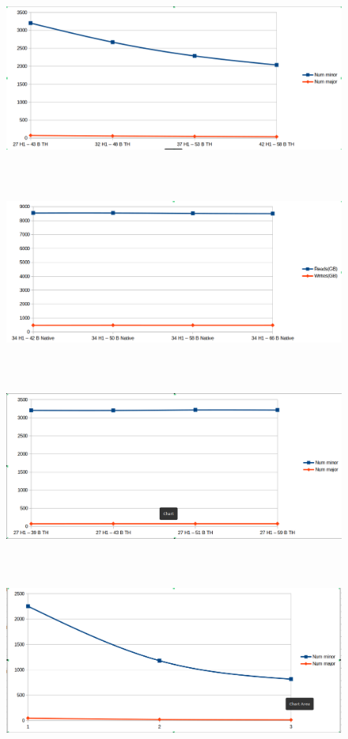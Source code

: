 \documentclass[twocolumn,10pt]{asme2e}
\begin{document}
\begin{figure}[h!]
        \includegraphics[width=12cm,height=6cm]{gcs_linr_h1_th.png}
\end{figure}

\begin{figure}[h!]
        \includegraphics[width=12cm,height=6cm]{gcs_linr_pc_native.png}
\end{figure}

\begin{figure}[h!]
        \includegraphics[width=12cm,height=6cm]{gcs_linr_pc_th.png}
\end{figure}

\begin{figure}[h!]
        \includegraphics[width=12cm,height=6cm]{gcs_pr_h1_th.png}
\end{figure}
\end{document}
